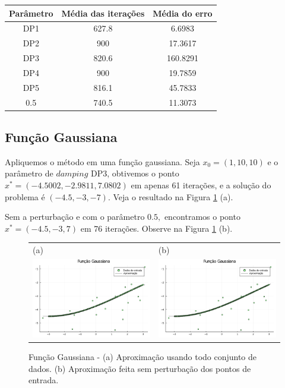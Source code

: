 \documentclass[12pt,a4paper]{article}
\begin{document}
	\begin{table}[H]
		\centering
		\begin{tabular}{|c|c|c|}
			\hline
			Parâmetro & Média das iterações & Média do erro\\
			\hline
			
			DP1 & 627.8 & 6.6983\\
			\hline
			DP2 & 900 & 17.3617\\ \hline
			DP3 & 820.6 & 160.8291\\ \hline
			DP4 & 900 & 19.7859\\ \hline
			DP5 & 816.1 & 45.7833\\ \hline
			0.5 & 740.5 & 11.3073\\		\hline	
			
		\end{tabular}
	\end{table}

	\subsection{Função Gaussiana} \label{gau}
	Apliquemos o método em uma função gaussiana. Seja $x_0 = (1, 10, 10)$ e o parâmetro de $damping$ DP3, obtivemos o ponto $x^* = (-4.5002, -2.9811,7.0802)$ em apenas 61 iterações, e a solução do problema é $(-4.5, -3, -7).$ Veja o resultado na Figura \ref{fig4} (a).
	
	Sem a perturbação e com o parâmetro $0.5,$ encontramos o ponto $x^* = (-4.5,-3, 7)$ em 76 iterações. Observe na Figura \ref{fig4} (b).
	
	\begin{figure}[H]
		\centering 
		\begin{tabular}{ll}
			
			(a)& (b)   \\
			
			\includegraphics[width=0.45\linewidth]{7.png} & \includegraphics[width=0.45\linewidth]{8.png}\\ 
			
		\end{tabular}
		\caption{Função Gaussiana - (a) Aproximação usando todo conjunto de dados. (b) Aproximação feita sem perturbação dos pontos de entrada.}
		\label{fig4}
	\end{figure}
	
\end{document}
